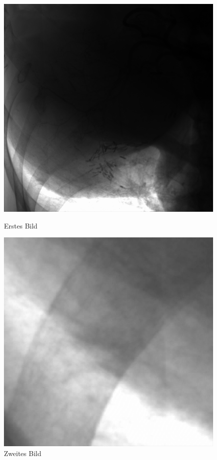 \documentclass[a4paper,12pt]{article}
\theoremstyle{definition}
\theoremstyle{remark}
\begin{document}
\begin{figure}[H]
  \centering
  \begin{minipage}{0.49\textwidth}
    \centering
    \includegraphics[width=\linewidth]{Bilder/edited.png}
    \caption{Erstes Bild}
    \label{fig:bild1}
  \end{minipage}
  \hfill
  \begin{minipage}{0.49\textwidth}
    \centering
    \includegraphics[width=\linewidth]{Bilder/edited_zoomed.png}
    \caption{Zweites Bild}
    \label{fig:bild2}
  \end{minipage}
\end{figure}
        
\end{document}
